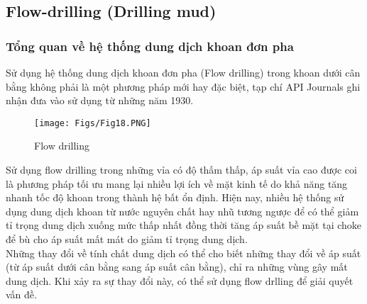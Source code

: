 \documentclass[12pt,a4paper]{article}
\begin{document}
\subsection{Flow-drilling (Drilling mud)}
	\subsubsection{Tổng quan về hệ thống dung dịch khoan đơn pha}
	Sử dụng hệ thống dung dịch khoan đơn pha (Flow drilling)\cite{rehm2013underbalanced} trong khoan dưới cân bằng không phải là một phương pháp mới hay đặc biệt, tạp chí API Journals ghi nhận đưa vào sử dụng từ những năm 1930. \\
	\begin{figure}[h]
		\centering
		\texttt{[image: Figs/Fig18.PNG]}
		\caption{Flow drilling\cite{rehm2013underbalanced}}
	\end{figure}
	Sử dụng flow drilling trong những vỉa có độ thấm thấp, áp suất vỉa cao được coi là phương pháp tối ưu mang lại nhiều lợi ích về mặt kinh tế do khả năng tăng nhanh tốc độ khoan trong thành hệ bất ổn định. Hiện nay, nhiều hệ thống sử dụng dung dịch khoan từ nước nguyên chất hay nhũ tương ngược để có thể giảm tỉ trọng dung dịch xuống mức thấp nhất đồng thời tăng áp suất bề mặt tại choke để bù cho áp suất mất mát do giảm tỉ trọng dung dịch.\\
	Những thay đổi về tính chất dung dịch có thể cho biết những thay đổi về áp suất (từ áp suất dưới cân bằng sang áp suất cân bằng), chỉ ra những vùng gây mất dung dịch. Khi xảy ra sự thay đổi này, có thể sử dụng flow drlling để giải quyết vấn đề.
\end{document}
